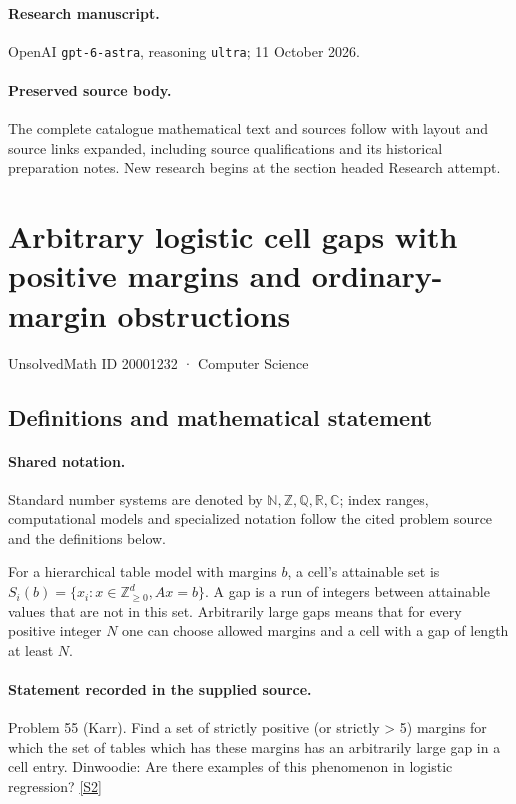 \documentclass[11pt]{article}
\begin{document}
\paragraph{Research manuscript.} OpenAI \texttt{gpt-6-astra}, reasoning \texttt{ultra}; 11 October 2026.
\paragraph{Preserved source body.} The complete catalogue mathematical text and sources follow with layout and source links expanded, including source qualifications and its historical preparation notes. New research begins at the section headed Research attempt.

\section{Arbitrary logistic cell gaps with positive margins and ordinary-margin obstructions}\label{20001232}
{\small UnsolvedMath ID 20001232 · Computer Science}
\subsection{Definitions and mathematical statement}

\paragraph{Shared notation.}Standard number systems are denoted by $\mathbb N,\mathbb Z,\mathbb Q,\mathbb R,\mathbb C$; index ranges, computational models and specialized notation follow the cited problem source and the definitions below.


For a hierarchical table model with margins $b$, a cell's attainable set is $S_i(b)=\{x_i:x\in\mathbb Z_{\ge0}^d,Ax=b\}$. A gap is a run of integers between attainable values that are not in this set. Arbitrarily large gaps means that for every positive integer $N$ one can choose allowed margins and a cell with a gap of length at least $N$.
\paragraph{Statement recorded in the supplied source.}
Problem 55 (Karr). Find a set of strictly positive (or strictly > 5) margins for which the set of tables which has these margins has an arbitrarily large gap in a cell entry. Dinwoodie: Are there examples of this phenomenon in logistic regression? \href{https://aimath.org/WWN/compalgstat/compalgstat.pdf}{[S2]}
\end{document}
